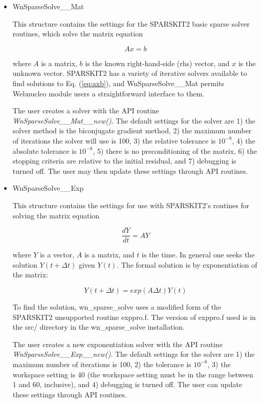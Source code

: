 \documentclass{article}    %
\begin{document}
\begin{itemize}

\item WnSparseSolve\_\_Mat

This structure contains the settings for the SPARSKIT2 basic sparse solver
routines, which solve the matrix equation

\begin{equation}
A x = b
\label{eq:axb}
\end{equation}

where $A$ is a matrix, $b$ is the known right-hand-side (rhs) vector, and
$x$ is the unknown vector.  SPARSKIT2 has a variety of iterative solvers
available to find solutions to Eq. (\ref{eq:axb}), and WnSparseSolve\_\_Mat
permits Webnucleo module users a straightforward interface to them.

The user creates a solver with the API routine
{\em WnSparseSolve\_\_Mat\_\_new()}.  The default settings for the solver are
1) the solver method is the biconjugate gradient method, 2) the maximum number
of iterations the solver will use is 100, 3) the relative tolerance is
$10^{-8}$, 4) the absolute tolerance is $10^{-8}$, 5) there is no
preconditioning of the matrix, 6) the stopping criteria are relative to
the initial residual, and 7) debugging is turned off.  The user
may then update these settings through API routines.

\item WnSparseSolve\_\_Exp

This structure contains the settings for use with SPARSKIT2's routines for
solving the matrix equation

\begin{equation}
\frac{dY}{dt} = AY
\label{eq:exp_dydt}
\end{equation}

where $Y$ is a vector, $A$ is a matrix, and $t$ is the time.  In general
one seeks the solution $Y(t + \Delta t)$ given $Y(t)$.  The formal
solution is by exponentiation of the matrix:

\begin{equation}
Y( t + \Delta t ) = exp(A \Delta t) Y( t )
\label{eq:exp_sol}
\end{equation}

To find the solution, wn\_sparse\_solve uses a modified form of the
SPARSKIT2 unsupported routine exppro.f.  The version of exppro.f used
is in the src/ directory in the wn\_sparse\_solve installation.

The user creates a new exponentiation solver with the API routine
{\em WnSparseSolve\_\_Exp\_\_new()}.  The default settings for the solver
are 1) the maximum number of iterations is 100, 2) the tolerance is 
$10^{-8}$, 3) the workspace setting is 40 (the workspace setting must be 
in the range between 1 and 60, inclusive), and 4) debugging is turned off.
The user can update these settings through API routines.


\end{itemize}
\end{document}

